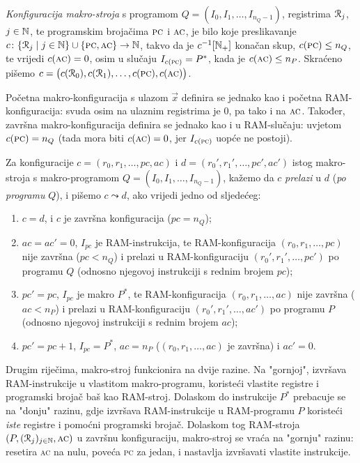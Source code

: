\begin{definicija}[{name=[makro-konfiguracija]}]\label{def:macroconf}
\emph{Konfiguracija makro-stroja} s programom $Q=(I_0,I_1,\dotsc,I_{n_Q-1})$, registrima $\mathcal R_{j}$, $j\in{\mathbb N}$, te programskim brojačima $\textsc{pc}$ i $\textsc{ac}$, je bilo koje preslikavanje $c\colon\{\mathcal R_{j}\mid j\in{\mathbb N}\}\cup\{\textsc{pc},\textsc{ac}\}\to{\mathbb N}$, takvo da je $c^{-1}[{\mathbb N}_+]$ konačan skup, $c(\textsc{pc})\le n_Q$, te vrijedi $c(\textsc{ac})=0$, osim u slučaju $I_{c(\textsc{pc})}=P^*$, kada je $c(\textsc{ac})\le n_P$. Skraćeno pišemo $c=\bigl(c(\mathcal R_{0}),c(\mathcal R_{1}),\dotsc,c(\textsc{pc}),c(\textsc{ac})\bigr)$.

Početna makro-konfiguracija s ulazom $\vec x$ definira se jednako kao i početna RAM-konfiguracija: svuda osim na ulaznim registrima je $0$, pa tako i na $\textsc{ac}$. Također, završna makro-konfiguracija definira se jednako kao i u RAM-slučaju: uvjetom $c(\textsc{pc})=n_Q$ (tada mora biti $c(\textsc{ac})=0$, jer $I_{c(\textsc{pc})}$ uopće ne postoji).
\end{definicija}

\begin{definicija}[{name=[prijelazi među makro-konfiguracijama]}]\label{def:makrolead}
Za konfiguracije $c=(r_0,r_1,\dotsc,pc,ac)$ i $d=(r_0',r_1',\dotsc,pc',ac')$ istog makro-stroja s makro-programom $Q=(I_0,I_1,\dotsc,I_{n_Q-1})$, kažemo da $c$ \emph{prelazi} u $d$ (\emph{po programu} $Q$), i pišemo $c\leadsto d$, ako vrijedi jedno od sljedećeg:
\begin{enumerate}
    \item\label{stav:zav} $c=d$, i $c$ je završna konfiguracija ($pc=n_Q$);
    \item\label{stav:Q} $ac=ac'=0$, $I_{pc}$ je RAM-instrukcija, te RAM-konfiguracija $(r_0,r_1,\dotsc,pc)$ nije završna ($pc<n_Q$) i prelazi u RAM-konfiguraciju $(r_0',r_1',\dotsc,pc')$ po programu $Q$ (odnosno njegovoj instrukciji s rednim brojem $pc$);
    \item\label{stav:P} $pc'=pc$, $I_{pc}$ je makro $P^*$, te RAM-konfiguracija $(r_0,r_1,\dotsc,ac)$ nije završna ($ac<n_P$) i prelazi u RAM-konfiguraciju $(r_0',r_1',\dotsc,ac')$ po programu $P$ (odnosno njegovoj instrukciji s rednim brojem $ac$);
    \item\label{stav:carry} $pc'=pc+1$, $I_{pc}=P^*$, $ac=n_P$ ($(r_0,r_1,\dotsc,ac)$ je završna) i $ac'=0$.\qedhere
\end{enumerate}
\end{definicija}

Drugim riječima, makro-stroj funkcionira na dvije razine. Na "gornjoj", izvršava RAM-instrukcije u vlastitom makro-programu, koristeći vlastite registre i programski brojač baš kao RAM-stroj. Dolaskom do instrukcije $P^*$ prebacuje se na "donju" razinu, gdje izvršava RAM-instrukcije u RAM-programu $P$ koristeći \emph{iste} registre i pomoćni programski brojač. Dolaskom tog RAM-stroja $(P,(\mathcal R_{j})_{j\in{\mathbb N}},\textsc{ac})$ u završnu konfiguraciju, makro-stroj se vraća na "gornju" razinu: resetira \textsc{ac} na nulu, poveća \textsc{pc} za jedan, i nastavlja izvršavati vlastite instrukcije.

